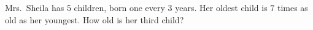 Mrs.\ Sheila has $5$ children, born one every $3$ years. Her oldest child is $7$ times as old as her youngest. How old is her third child?
